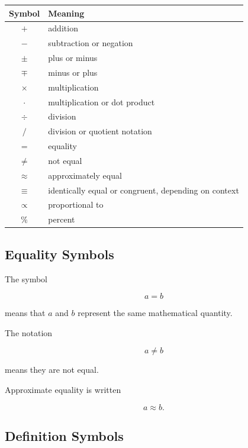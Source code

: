 \begin{center}
\begin{tabular}{c|l}
\textbf{Symbol} & \textbf{Meaning} \\ \hline
\( + \) & addition \\
\( - \) & subtraction or negation \\
\( \pm \) & plus or minus \\
\( \mp \) & minus or plus \\
\( \times \) & multiplication \\
\( \cdot \) & multiplication or dot product \\
\( \div \) & division \\
\( / \) & division or quotient notation \\
\( = \) & equality \\
\( \neq \) & not equal \\
\( \approx \) & approximately equal \\
\( \equiv \) & identically equal or congruent, depending on context \\
\( \propto \) & proportional to \\
\( \% \) & percent
\end{tabular}
\end{center}

\subsection{Equality Symbols}
\label{subsec:equality-symbols}

The symbol

\[
\boxed{
a=b
}
\]

means that \(a\) and \(b\) represent the same mathematical quantity.

The notation

\[
\boxed{
a\neq b
}
\]

means they are not equal.

Approximate equality is written

\[
\boxed{
a\approx b.
}
\]

\subsection{Definition Symbols}
\label{subsec:definition-symbols}

